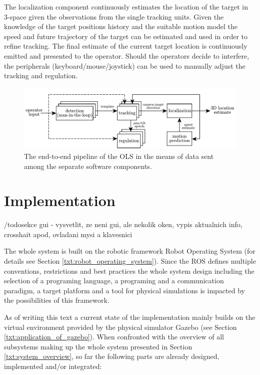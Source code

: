 The localization component continuously estimates the location of the target in 3-space given the observations from the single tracking units. Given the knowledge of the target positions history and the suitable motion model the speed and future trajectory of the target can be estimated and used in order to refine tracking. The final estimate of the current target location is continuously emitted and presented to the operator. Should the operators decide to interfere, the peripherals (keyboard/mouse/joystick) can be used to manually adjust the tracking and regulation.

\begin{figure}[htb]
	\centering
	\includegraphics[width=0.95\linewidth]{fig/pipeline.pdf}
	\caption{The end-to-end pipeline of the OLS in the means of data sent among the separate software components.}
	\label{fig:pipeline}
\end{figure}


\chapter{Implementation} \label{txt:implementation}

/todo{sekce gui - vysvetlit, ze neni gui, ale nekolik oken, vypis aktualnich info, crosshait apod, ovladani mysi a klavesnici}

The whole system is built on the robotic framework Robot Operating System (for details see Section \ref{txt:robot_operating_system}). Since the ROS defines multiple conventions, restrictions and best practices the whole system design including the selection of a programing language, a programing and a communication paradigm, a target platform and a tool for physical simulations is impacted by the possibilities of this framework.

As of writing this text a current state of the implementation mainly builds on the virtual environment provided by the physical simulator Gazebo (see Section \ref{txt:application_of_gazebo}). When confronted with the overview of all subsystems making up the whole system presented in Section \ref{txt:system_overview}, so far the following parts are already designed, implemented and/or integrated:

